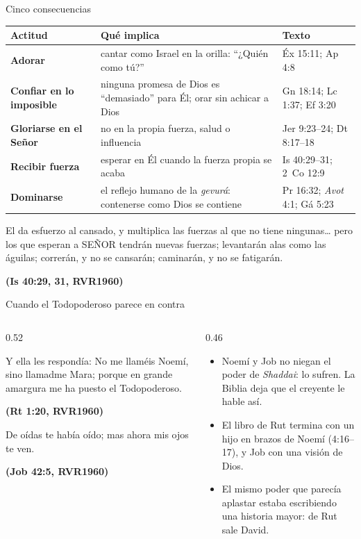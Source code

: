 \documentclass[hyperref={bookmarks=false},aspectratio=169]{beamer}
\newcommand{\SENOR}{S{\fontsize{0.78em}{1em}\selectfont EÑOR}}
\newcommand{\fuente}[1]{\par\hfill{\upshape\bfseries\footnotesize\textcolor{azul}{#1}}}
\newcommand{\destacar}[1]{\textbf{\textcolor{azul}{#1}}}
\begin{document}
\begin{frame}{Cinco consecuencias}
\scriptsize\renewcommand{\arraystretch}{1.22}
\begin{tabular}{@{}>{\RaggedRight\arraybackslash}p{2.4cm}>{\RaggedRight\arraybackslash}p{6.2cm}>{\RaggedRight\arraybackslash}p{3.3cm}@{}}
\toprule
\textbf{Actitud} & \textbf{Qué implica} & \textbf{Texto} \\ \midrule
\destacar{Adorar} & cantar como Israel en la orilla: ``¿Quién como tú?'' & Éx 15:11; Ap 4:8 \\
\destacar{Confiar en lo imposible} & ninguna promesa de Dios es ``demasiado'' para Él; orar sin achicar a Dios & Gn 18:14; Lc 1:37; Ef 3:20 \\
\destacar{Gloriarse en el Señor} & no en la propia fuerza, salud o influencia & Jer 9:23--24; Dt 8:17--18 \\
\destacar{Recibir fuerza} & esperar en Él cuando la fuerza propia se acaba & Is 40:29--31; 2~Co 12:9 \\
\destacar{Dominarse} & el reflejo humano de la \emph{gevurá}: contenerse como Dios se contiene & Pr 16:32; \emph{Avot} 4:1; Gá 5:23 \\
\bottomrule
\end{tabular}\par\medskip
\begin{cita}El da esfuerzo al cansado, y multiplica las fuerzas al que no tiene ningunas\ldots{} pero los que esperan a \SENOR{} tendrán nuevas fuerzas; levantarán alas como las águilas; correrán, y no se cansarán; caminarán, y no se fatigarán.\fuente{(Is 40:29, 31, RVR1960)}\end{cita}
\end{frame}

\begin{frame}{Cuando el Todopoderoso parece en contra}
\begin{columns}[c,onlytextwidth]
\begin{column}{0.52\textwidth}
\begin{cita}[fontupper=\scriptsize\itshape]Y ella les respondía: No me llaméis Noemí, sino llamadme Mara; porque en grande amargura me ha puesto el Todopoderoso.\fuente{(Rt 1:20, RVR1960)}\end{cita}
\begin{cita}[fontupper=\scriptsize\itshape]De oídas te había oído; mas ahora mis ojos te ven.\fuente{(Job 42:5, RVR1960)}\end{cita}
\end{column}
\begin{column}{0.46\textwidth}\small
\begin{itemize}
\item Noemí y Job no niegan el poder de \emph{Shaddai}: lo sufren. La Biblia deja que el creyente le hable así.
\item El libro de Rut termina con un hijo en brazos de Noemí (4:16--17), y Job con una visión de Dios.
\item El mismo poder que parecía aplastar estaba escribiendo una historia mayor: de Rut sale David.
\end{itemize}
\end{column}
\end{columns}
\end{frame}
\end{document}
